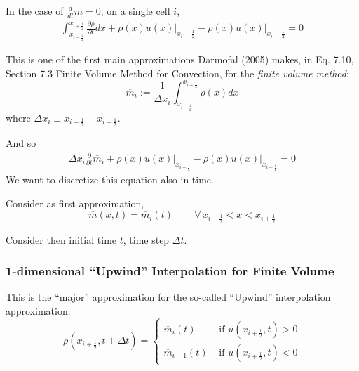 \documentclass[10pt]{amsart}
\begin{document}
\begin{multicols*}{2}
In the case of $\frac{d}{dt}m = 0$, on a single cell $i$,
\[
\begin{gathered}
  \int_{x_{i-\frac{1}{2} }}^{x_{i+\frac{1}{2} } } \frac{ \partial \rho }{ \partial t} dx + \left. \rho(x) u(x) \right|_{x_i + \frac{1}{2} } - \left. \rho(x)u(x) \right|_{x_i-\frac{1}{2} } = 0 
  \end{gathered}
\]

This is one of the first main approximations Darmofal (2005) \cite{Darm2005} makes, in Eq. 7.10, Section 7.3 Finite Volume Method for Convection, for the \emph{finite volume method}:
\begin{equation}
  \overline{m}_i := \frac{1}{\Delta x_i} \int_{x_{i - \frac{1}{2} }}^{x_{i+\frac{1}{2} } } \rho(x)dx
\end{equation}
where $\Delta x_i \equiv x_{i+\frac{1}{2}} - x_{i+\frac{1}{2}}$.

And so
\begin{equation}
  \begin{gathered}
    \Delta x_i \frac{\partial }{ \partial t} \overline{m}_i + \left. \rho(x)u(x) \right|_{x_{i+\frac{1}{2} } } - \left. \rho(x)u(x) \right|_{x_{i-\frac{1}{2} } } =0
  \end{gathered}
  \end{equation}
We want to discretize this equation also in time.

Consider as first approximation,
\begin{equation}
  \overline{m}(x,t) = \overline{m}_i(t) \qquad \, \forall \, x_{i-\frac{1}{2}} < x < x_{i+\frac{1}{2}}
\end{equation}

Consider then initial time $t$, time step $\Delta t$.   

\subsubsection{1-dimensional ``Upwind'' Interpolation for Finite Volume}

This is the ``major'' approximation for the so-called ``Upwind'' interpolation approximation:
\begin{equation}\label{Eq:rhoUpwindInterp}
  \rho(x_{i+\frac{1}{2} },t+\Delta t) = \begin{cases} \overline{m}_i(t) & \text{ if } u(x_{i+\frac{1}{2} },t) > 0 \\
    \overline{m}_{i+1}(t) & \text{ if } u(x_{i+\frac{1}{2} },t) < 0
    \end{cases}
\end{equation}


\end{multicols*}
\end{document}
